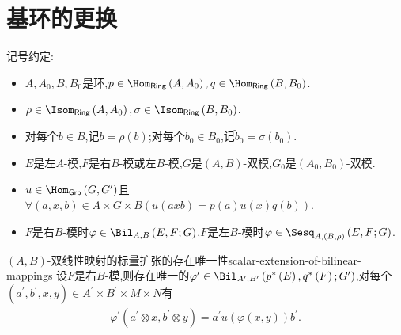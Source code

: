 \section{基环的更换}

记号约定:
\begin{itemize}
	\item $A,A_{0},B,B_{0}$是环,$p\in\Hom_{\mathsf{Ring}}\left(A,A_{0}\right),q\in\Hom_{\mathsf{Ring}}\left(B,B_{0}\right)$.
	\item $\rho\in\Isom_{\mathsf{Ring}}\left(A,A_{0}\right),\sigma\in\Isom_{\mathsf{Ring}}\left(B,B_{0}\right)$.
	\item 对每个$b\in B$,记$\bar{b}=\rho\left(b\right)$;对每个$b_{0}\in B_{0}$,记$\tilde{b}_{0}=\sigma\left(b_{0}\right)$.
	\item $E$是左$A$-模,$F$是右$B$-模或左$B$-模,$G$是$\left(A,B\right)$-双模,$G_{0}$是$\left(A_{0},B_{0}\right)$-双模.
	\item $u\in\Hom_{\mathsf{Grp}}\left(G,G^{\prime}\right)$且$\forall\left(a,x,b\right)\in A\times G\times B\left(u\left(axb\right)=p\left(a\right)u\left(x\right)q\left(b\right)\right)$.
	\item $F$是右$B$-模时$\varphi\in\Bil_{A,B}\left(E,F;G\right)$,$F$是左$B$-模时$\varphi\in\Sesq_{A,(B,\rho)}\left(E,F;G\right)$.
\end{itemize}

\begin{proposition}{$\left(A,B\right)$-双线性映射的标量扩张的存在唯一性}{scalar-extension-of-bilinear-mappings}
	设$F$是右$B$-模,则存在唯一的$\varphi^{\prime}\in\Bil_{A^{\prime},B^{\prime}}\left(p^{\ast}\left(E\right),q^{\ast}\left(F\right);G^{\prime}\right)$,对每个$\left(a^{\prime},b^{\prime},x,y\right)\in A^{\prime}\times B^{\prime}\times M\times N$有
	\begin{align*}
		\varphi^{\prime}\left(a^{\prime}\otimes x,b^{\prime}\otimes y\right)=a^{\prime}u\left(\varphi\left(x,y\right)\right)b^{\prime}.
	\end{align*}
\end{proposition}

